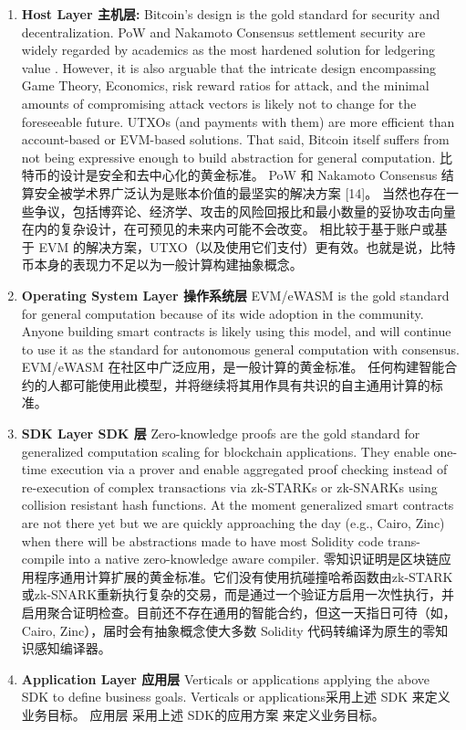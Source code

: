 \documentclass{ctexart}
\begin{document}
\begin{enumerate}
\item \textbf{Host Layer 主机层:} Bitcoin’s design is the gold standard for security and decentralization. PoW and Nakamoto Consensus settlement security are widely regarded by academics as the most hardened solution for ledgering value \cite{Bit15}. However, it is also arguable that the intricate design encompassing Game Theory, Economics, risk reward ratios for attack, and the minimal amounts of compromising attack vectors is likely not to change for the foreseeable future. UTXOs (and payments with them) are more efficient than account-based or EVM-based solutions. That said, Bitcoin itself suffers from not being expressive enough to build abstraction for general computation. 比特币的设计是安全和去中心化的黄金标准。 PoW 和 Nakamoto Consensus 结算安全被学术界广泛认为是账本价值的最坚实的解决方案 [14]。 当然也存在一些争议，包括博弈论、经济学、攻击的风险回报比和最小数量的妥协攻击向量在内的复杂设计，在可预见的未来内可能不会改变。 相比较于基于账户或基于 EVM 的解决方案，UTXO（以及使用它们支付）更有效。也就是说，比特币本身的表现力不足以为一般计算构建抽象概念。
\item \textbf{Operating System Layer 操作系统层} EVM/eWASM is the gold standard for general computation because of its wide adoption in the community. Anyone building smart contracts is likely using this model, and will continue to use it as the standard for autonomous general computation with consensus. EVM/eWASM 在社区中广泛应用，是一般计算的黄金标准。 任何构建智能合约的人都可能使用此模型，并将继续将其用作具有共识的自主通用计算的标准。
\item \textbf{SDK Layer SDK 层} Zero-knowledge proofs are the gold standard for generalized computation scaling for blockchain applications. They enable one-time execution via a prover and enable aggregated proof checking instead of re-execution of complex transactions via zk-STARKs or zk-SNARKs using collision resistant hash functions. At the moment generalized smart contracts are not there yet but we are quickly approaching the day (e.g., Cairo, Zinc) when there will be abstractions made to have most Solidity code trans-compile into a native zero-knowledge aware compiler. 零知识证明是区块链应用程序通用计算扩展的黄金标准。它们没有使用抗碰撞哈希函数由zk-STARK 或zk-SNARK重新执行复杂的交易，而是通过一个验证方启用一次性执行，并启用聚合证明检查。目前还不存在通用的智能合约，但这一天指日可待（如，Cairo, Zinc），届时会有抽象概念使大多数 Solidity 代码转编译为原生的零知识感知编译器。
\item \textbf{Application Layer 应用层} Verticals or applications applying the above SDK to define business goals. Verticals or applications采用上述 SDK 来定义业务目标。
应用层 采用上述 SDK的应用方案 来定义业务目标。 
\end{enumerate}
\end{document}
